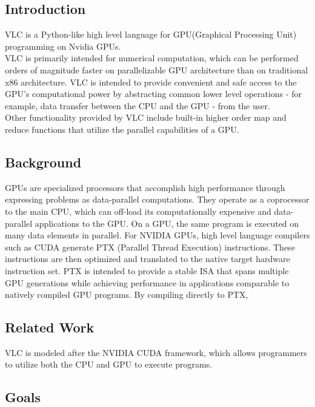\begin{homeworkProblem}
	\chapter{Introduction}
    VLC is a Python-like high level language for GPU(Graphical Processing Unit) programming on Nvidia GPUs.\\

    VLC is primarily intended for numerical computation, which can be performed orders of magnitude faster on parallelizable GPU architecture than on traditional x86 architecture. VLC is intended to provide convenient and safe access to the GPU’s computational power by abstracting common lower level operations - for example, data transfer between the CPU and the GPU - from the user.\\

    Other functionality provided by VLC include built-in higher order map and reduce functions that utilize the parallel capabilities of a GPU.
	
	\section{Background}
	GPUs are specialized processors that accomplish high performance through expressing problems as data-parallel computations.  They operate as a coprocessor to the main CPU, which can off-load its computationally expensive and data-parallel applications to the GPU.  On a GPU, the same program is executed on many data elements in parallel. For NVIDIA GPUs, high level language compilers such as CUDA generate PTX (Parallel Thread Execution) instructions.  These instructions are then optimized and translated to the native target hardware instruction set. PTX is intended to provide a stable ISA that spans multiple GPU generations while achieving performance in applications comparable to natively compiled GPU programs.  By compiling directly to PTX,  
	
	\section{Related Work}
    VLC is modeled after the NVIDIA CUDA framework, which allows programmers to utilize both the CPU and GPU to execute programs.
    
	\section{Goals}

\end{homeworkProblem}
